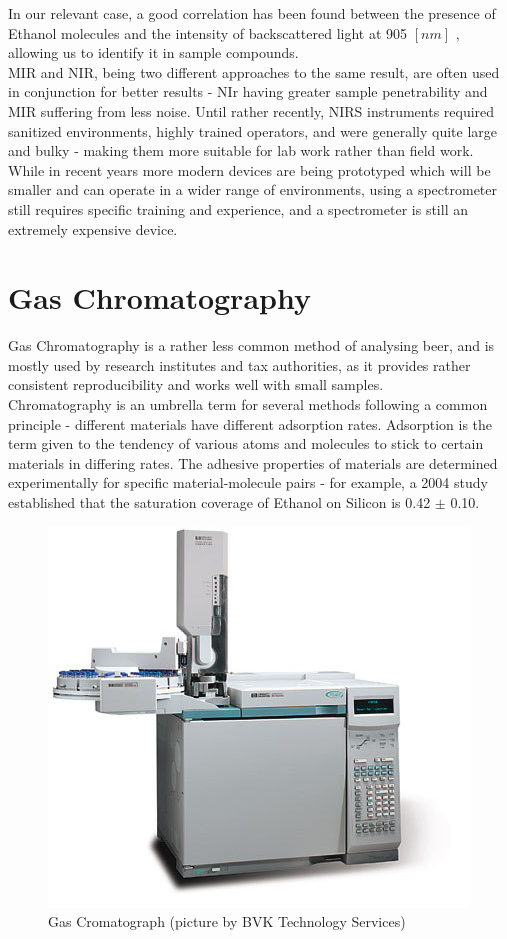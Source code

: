 \documentclass[twoside]{ctuthesis}
\theoremstyle{plain}
\theoremstyle{definition}
\theoremstyle{note}
\begin{document}
In our relevant case, a good correlation has been found between the presence of Ethanol molecules and the intensity of backscattered light at 905 $[nm]$  \cite{NIR_Spectroscopy_Ethanol}, allowing us to identify it in sample compounds.\\
MIR and NIR, being two different approaches to the same result, are often used in conjunction for better results - NIr having greater sample penetrability and MIR suffering from less noise.
Until rather recently, NIRS instruments required sanitized environments, highly trained operators, and were generally quite large and bulky - making them more suitable for lab work rather than field work\cite{NIR_For_Spices}.\\ While in recent years more modern devices are being prototyped which will be smaller and can operate in a wider range of environments, using a spectrometer still requires specific training and experience, and a spectrometer is still an extremely expensive device.

\section{Gas Chromatography}
Gas Chromatography is a rather less common method of analysing beer, and is mostly used by research institutes and tax authorities, as it provides rather consistent reproducibility and works well with small samples.\\
Chromatography is an umbrella term for several methods following a common principle - different materials have different adsorption rates. Adsorption is the term given to the tendency of various atoms and molecules to stick to certain materials in differing rates. The adhesive properties of materials are determined experimentally for specific material-molecule pairs - for example, a 2004 study established that the saturation coverage of Ethanol on Silicon is 0.42 $\pm$ 0.10.\cite{Ehtnaol_adsorption,Gas_Chromatography_beer}\\

\begin{figure}[H]
	\centering
	\includegraphics[scale = 0.4]{refurbished-gas_chromatograph}
	\caption{Gas Cromatograph (picture by BVK Technology Services)}
\end{figure}
\end{document}
